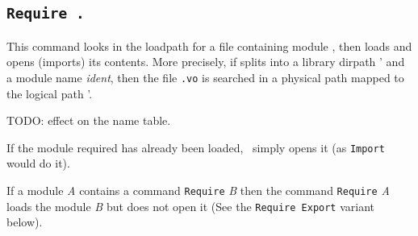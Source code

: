 






\subsection{\tt Require {\dirpath}.}
\label{Require}

This command looks in the loadpath for a file containing module
{\dirpath}, then loads and opens (imports) its contents.
More precisely, if {\dirpath} splits into a library dirpath {\dirpath'} and a module name {\textsl{ident}}, then the file {\ident}{\tt .vo} is searched in a physical path mapped to the logical path {\dirpath'}.

TODO: effect on the name table.

If the module required has already been loaded, \Coq\ 
simply opens it (as {\tt Import {\dirpath}} would do it).

If a module {\it A} contains a command {\tt Require} {\it B} then the
command {\tt Require} {\it A} loads the module {\it B} but does not
open it (See the {\tt Require Export} variant below).

